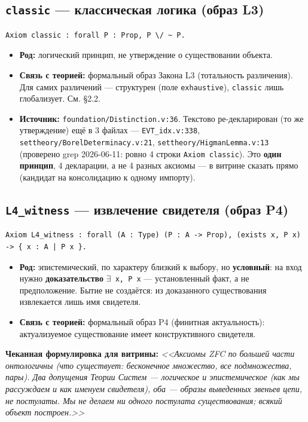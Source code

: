 \documentclass[11pt,a4paper]{article}
\begin{document}
\subsection{\texttt{classic} --- классическая логика (образ L3)}
\begin{lstlisting}
Axiom classic : forall P : Prop, P \/ ~ P.
\end{lstlisting}
\begin{itemize}
\item \textbf{Род:} логический принцип, не утверждение о существовании объекта.
\item \textbf{Связь с теорией:} формальный образ Закона L3 (тотальность различения). Для самих различений --- структурен (поле \texttt{exhaustive}), \texttt{classic} лишь глобализует. См. \S{}2.2.
\item \textbf{Источник:} \texttt{foundation/\allowbreak{}Distinction.v:36}. Текстово ре-декларирован (то же утверждение) ещё в 3 файлах --- \texttt{EVT\_\allowbreak{}idx.v:338}, \texttt{settheory/\allowbreak{}Borel\allowbreak{}Determinacy.v:21}, \texttt{settheory/\allowbreak{}Higman\allowbreak{}Lemma.v:13} (проверено grep 2026-06-11: ровно 4 строки \texttt{Axiom classic}). Это \textbf{один принцип}, 4 декларации, а не 4 разных аксиомы --- в витрине сказать прямо (кандидат на консолидацию к одному импорту).
\end{itemize}

\subsection{\texttt{L4\_\allowbreak{}witness} --- извлечение свидетеля (образ P4)}
\begin{lstlisting}
Axiom L4_witness : forall (A : Type) (P : A -> Prop), (exists x, P x) -> { x : A | P x }.
\end{lstlisting}
\begin{itemize}
\item \textbf{Род:} эпистемический, по характеру близкий к выбору, но \textbf{условный}: на вход нужно \textbf{доказательство} \texttt{$\exists$ x,\allowbreak{} P x} --- установленный факт, а не предположение. Бытие не создаётся: из доказанного существования извлекается лишь имя свидетеля.
\item \textbf{Связь с теорией:} формальный образ P4 (финитная актуальность): актуализуемое существование имеет конструктивного свидетеля.
\end{itemize}

\textbf{Чеканная формулировка для витрины:} \emph{<<Аксиомы ZFC по большей части онтологичны (что существует: бесконечное множество, все подмножества, пары). Два допущения Теории Систем --- логическое и эпистемическое (как мы рассуждаем и как именуем свидетеля), оба --- образы выведенных звеньев цепи, не постулаты. Мы не делаем ни одного постулата существования; всякий объект построен.>>}
\end{document}
